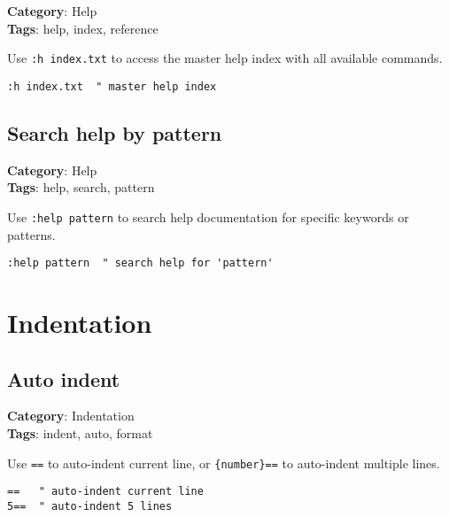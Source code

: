 {{{{{{\textbf{Category}: Help\\ \textbf{Tags}: help, index, reference
\vspace{0.5cm}

Use {\footnotesize \Verb§:h index.txt§} to access the master help index with all available commands.

\begin{Exa*}{}
\begin{Verbatim}[fontsize=\footnotesize, breaklines, breakanywhere]
:h index.txt  " master help index
\end{Verbatim}
\end{Exa*}

\section{Search help by pattern}

\textbf{Category}: Help\\ \textbf{Tags}: help, search, pattern
\vspace{0.5cm}

Use {\footnotesize \Verb§:help pattern§} to search help documentation for specific keywords or patterns.

\begin{Exa*}{}
\begin{Verbatim}[fontsize=\footnotesize, breaklines, breakanywhere]
:help pattern  " search help for 'pattern'
\end{Verbatim}
\end{Exa*}

\chapter{Indentation}
\section{Auto indent}

\textbf{Category}: Indentation\\ \textbf{Tags}: indent, auto, format
\vspace{0.5cm}

Use {\footnotesize \Verb§==§} to auto-indent current line, or {\footnotesize \Verb§{number}==§} to auto-indent multiple lines.

\begin{Exa*}{}
\begin{Verbatim}[fontsize=\footnotesize, breaklines, breakanywhere]
==   " auto-indent current line
5==  " auto-indent 5 lines
\end{Verbatim}
\end{Exa*}

}}}}}}
